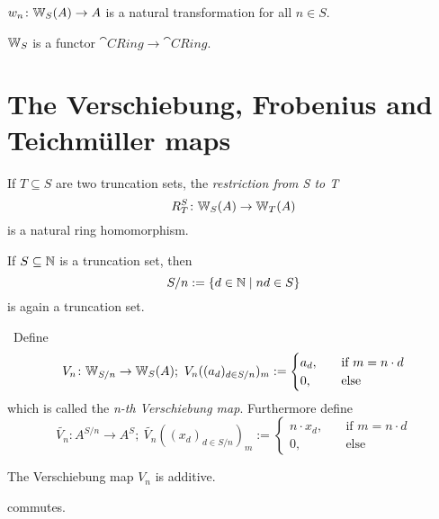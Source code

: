 \begin{bigproof}
    
\end{bigproof}
\begin{cor} \label{cor: ghost components are nat trafos}
    $w_n \colon \mathbb{W}_S(A) \to A$ is a natural transformation for all $n \in S$.
\end{cor}
\begin{proposition} \label{prop: W is a functor}
    $\mathbb{W}_S$ is a functor $\cat{CRing} \to \cat{CRing}$.
\end{proposition}
\section*{The Verschiebung, Frobenius and Teichmüller maps}
\begin{definition}
    If $T \subseteq S$ are two truncation sets, the \textit{restriction from S to T}
    \[
      R_T^S \colon \mathbb{W}_S(A) \to \mathbb{W}_T(A)  
    \]
    is a natural ring homomorphism.
\end{definition}
If $S\subseteq \mathbb{N}$ is a truncation set, then
\[
   S/n := \{d \in \mathbb{N} \mid nd \in S\}
\]
is again a truncation set.
\begin{definition}[Verschiebung] \
    Define 
    \[
        V_n \colon \mathbb{W}_{S/n} \to \mathbb{W}_S(A);\  
        V_n((a_d)_{d \in S/n})_m := 
        \begin{cases}
            a_d, &\quad \text{if $m=n \cdot d$} \\
            0,  &\quad \text{else}
        \end{cases}
    \]
    which is called the \textit{n-th Verschiebung map}. Furthermore define
    \[
        \widetilde{V_n} \colon A^{S/n} \to A^S;\ 
        \widetilde{V_n}((x_d)_{d \in S/n})_m := 
        \begin{cases}
            n \cdot x_d, &\quad \text{if $m=n \cdot d$} \\
            0,  &\quad \text{else}
        \end{cases}
    \]
\end{definition}
\begin{lemma} \label{lem: verschiebung is additive}
    The Verschiebung map $V_n$ is additive.
\end{lemma}
\begin{bigproof}
    \begin{claim*}
        commutes.
    \end{claim*}
    \begin{smallproof}
        
    \end{smallproof}
\end{bigproof}
